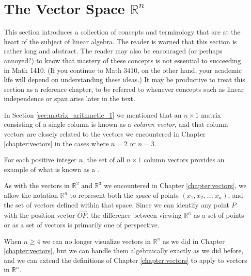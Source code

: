 \section{The Vector Space $\mathbb{R}^n$}\label{sec:Rn}
This section introduces a collection of concepts and terminology that are at the heart of the subject of linear algebra. The reader is warned that this section is rather long and abstract. The reader may also be encouraged (or perhaps annoyed?) to know that mastery of these concepts is not essential to succeeding in Math 1410. (If you continue to Math 3410, on the other hand, your academic life will depend on understanding these ideas.) It may be productive to treat this section as a reference chapter, to be referred to whenever concepts such as linear independence or span arise later in the text.

In Section \ref{sec:matrix_arithmetic_1} we mentioned that an $n\times 1$ matrix consisting of a single column is known as a \textit{column vector}, and that column vectors are closely related to the vectors we encountered in Chapter \ref{chapter:vectors} in the cases where $n=2$ or $n=3$. 

For each positive integer $n$, the set of all $n\times 1$ column vectors provides an example of what is known as a . 




As with the vectors in $\mathbb{R}^2$ and $\mathbb{R}^3$ we encountered in Chapter \ref{chapter:vectors}, we allow the notation $\mathbb{R}^n$ to represent both the \textit{space} of points $(x_1,x_2, \ldots, x_n)$, and the set of vectors defined within that space. Since we can identify any point $P$ with the position vector $\overrightarrow{OP}$, the difference between viewing $\mathbb{R}^n$ as a set of points or as a set of vectors is primarily one of perspective.

When $n\geq 4$ we can no longer visualize vectors in $\mathbb{R}^n$ as we did in Chapter \ref{chapter:vectors}, but we can handle them algebraically exactly as we did before, and we can extend the definitions of Chapter \ref{chapter:vectors} to apply to vectors in $\mathbb{R}^n$.


